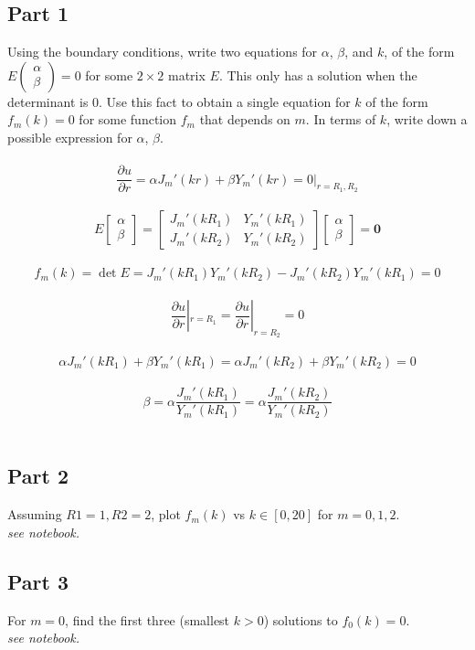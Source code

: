 \documentclass{amsart}
\begin{document}
	\subsection{Part 1}
	Using the boundary conditions, write two equations for $\alpha$, $\beta$, and $k$, of the form $E\left(
	\begin{matrix}
		\alpha \\ \beta
	\end{matrix}
	\right) = 0$ for some $2\times 2$ matrix $E$. This only has a solution when the determinant is 0. Use this fact to obtain a single equation for $k$ of the form $f_m(k) =0$ for some function $f_m$ that depends on $m$. In terms of $k$, write down a possible expression for $\alpha$, $\beta$.
	\\\\
	\[
		\frac{\partial u}{\partial r} = \alpha J_m'(kr) + \beta Y_m'(kr) = 0|_{r=R_1,R_2}
	\]
	\\
	\[
	E\left[
	\begin{matrix}
	\alpha \\ \beta
	\end{matrix}
	\right] = 
	\left[\begin{matrix}
		J_m'(kR_1) & Y_m'(kR_1)\\
		J_m'(kR_2) & Y_m'(kR_2)
	\end{matrix}\right]
	\left[
	\begin{matrix}
		\alpha \\ \beta
	\end{matrix}\right] = \mathbf{0}
	\]
	\\
	\[
	f_m(k) = \det E = J_m'(kR_1)Y_m'(kR_2) - J_m'(kR_2)Y_m'(kR_1) = 0
	\]
	\\
	\[
	\frac{\partial u}{\partial r}|_{r=R_1} = \frac{\partial u}{\partial r}|_{r=R_2} = 0
	\]
	\\
	\[
	\alpha J_m'(kR_1)+\beta Y_m'(kR_1) = \alpha J_m'(kR_2)+\beta Y_m'(kR_2) = 0
	\]
	\\
	\[
	\beta = \alpha \frac{J_m'(kR_1)}{Y_m'(kR_1)} = \alpha \frac{J_m'(kR_2)}{Y_m'(kR_2)}
	\]
	\\
	\subsection{Part 2}
	Assuming $R1 = 1, R2=2$, plot $f_m(k)$ vs $k \in [0,20]$ for $m=0,1,2$.
	\\
	\textit{see notebook.}
	\\
	\subsection{Part 3}
	For $m=0$, find the first three (smallest $k>0$)  solutions to $f_0(k) = 0$.
	\\
	\textit{see notebook.}
	\\
\end{document}
